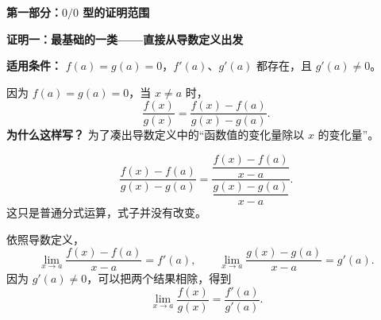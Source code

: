 \clearpage
\begin{proofbox}
\textbf{\textcolor{CProof}{第一部分：$0/0$ 型的证明范围}}\par\medskip
\textbf{\textcolor{CProof}{证明一：最基础的一类——直接从导数定义出发}}
\begin{center}\end{center}


\textbf{适用条件：} $f(a)=g(a)=0$，$f'(a)$、$g'(a)$ 都存在，且 $g'(a)\ne0$。

\begin{description}[style=nextline, leftmargin=2.6em, labelsep=0.4em, itemsep=0.55em]
    \item[\textbf{第1步：写出原式。}]
    因为 $f(a)=g(a)=0$，当 $x\ne a$ 时，
    \[
    \frac{f(x)}{g(x)}
    =\frac{f(x)-f(a)}{g(x)-g(a)}.
    \]
    \textbf{为什么这样写？} 为了凑出导数定义中的“函数值的变化量除以 $x$ 的变化量”。

    \item[\textbf{第2步：上下同时除以 $x-a$。}]
    \[
    \frac{f(x)-f(a)}{g(x)-g(a)}
    =\frac{\dfrac{f(x)-f(a)}{x-a}}
           {\dfrac{g(x)-g(a)}{x-a}}.
    \]
    这只是普通分式运算，式子并没有改变。

    \item[\textbf{第3步：让 $x$ 接近 $a$。}]
    依照导数定义，
    \[
    \lim_{x\to a}\frac{f(x)-f(a)}{x-a}=f'(a),\qquad
    \lim_{x\to a}\frac{g(x)-g(a)}{x-a}=g'(a).
    \]
    因为 $g'(a)\ne0$，可以把两个结果相除，得到
    \[
    \boxed{\displaystyle\lim_{x\to a}\frac{f(x)}{g(x)}
      =\frac{f'(a)}{g'(a)}.}
    \]
\end{description}

\end{proofbox}
\clearpage
